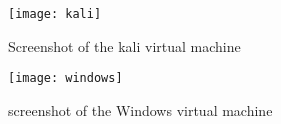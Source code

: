 \begin{figure}[h]
  \centering
  \texttt{[image: kali]}
  \caption{Screenshot of the kali virtual machine}
  \label{fig:kali}
\end{figure}

\begin{figure}[h]
  \centering
  \texttt{[image: windows]}
  \caption{screenshot of the Windows virtual machine}
  \label{fig:windows}
\end{figure}


